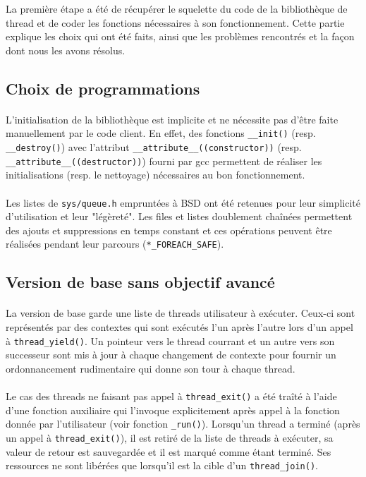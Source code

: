 La première étape a été de récupérer le squelette du code de la bibliothèque de thread et de coder les fonctions nécessaires à son fonctionnement. Cette partie explique les choix qui ont été faits, ainsi que les problèmes rencontrés et la façon dont nous les avons résolus.

\subsection{Choix de programmations}

\paragraph{} L'initialisation de la bibliothèque est implicite et ne nécessite
pas d'être faite manuellement par le code client. En effet, des fonctions
\verb!__init()!  (resp. \verb!__destroy()!) avec l'attribut
\verb!__attribute__((constructor))!  (resp.
\verb!__attribute__((destructor))!) fourni par gcc permettent de réaliser les
initialisations (resp. le nettoyage) nécessaires au bon fonctionnement.

\paragraph{} Les listes de \verb!sys/queue.h! empruntées à BSD ont été
retenues pour leur simplicité d'utilisation et leur "légèreté". Les files et
listes doublement chaînées permettent des ajouts et suppressions en temps
constant et ces opérations peuvent être réalisées pendant leur parcours
(\verb!*_FOREACH_SAFE!).


\subsection{Version de base sans objectif avancé}

\paragraph{} La version de base garde une liste de threads utilisateur à exécuter. Ceux-ci sont représentés par des contextes qui sont exécutés l'un après l'autre lors d'un appel à \verb!thread_yield()!. Un pointeur vers le thread courrant et un autre vers son successeur sont mis à jour à chaque changement de contexte pour fournir un ordonnancement rudimentaire qui donne son tour à chaque thread.

\paragraph{} Le cas des threads ne faisant pas appel à \verb!thread_exit()! a été traîté à l'aide d'une fonction auxiliaire qui l'invoque explicitement après appel à la fonction donnée par l'utilisateur (voir fonction \verb!_run()!). Lorsqu'un thread a terminé (après un appel à \verb!thread_exit()!), il est retiré de la liste de threads à exécuter, sa valeur de retour est sauvegardée et il est marqué comme étant terminé. Ses ressources ne sont libérées que lorsqu'il est la cible d'un \verb!thread_join()!.
